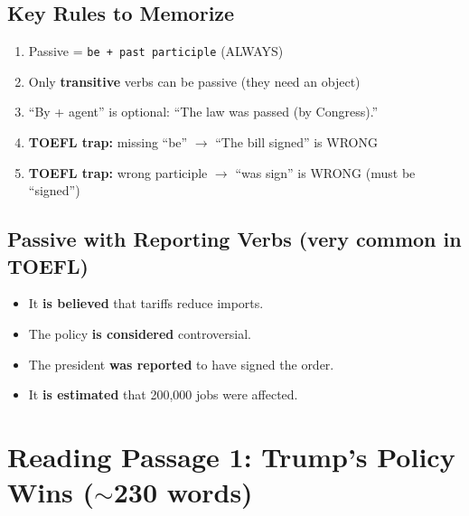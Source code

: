 \documentclass[10pt,a4paper]{article}
\begin{document}
\subsection*{Key Rules to Memorize}

\begin{enumerate}[nosep]
\item Passive = \texttt{be + past participle} (ALWAYS)
\item Only \textbf{transitive} verbs can be passive (they need an object)
\item ``By + agent'' is optional: ``The law was passed (by Congress).''
\item \textbf{TOEFL trap:} missing ``be'' $\to$ ``The bill signed'' is WRONG
\item \textbf{TOEFL trap:} wrong participle $\to$ ``was sign'' is WRONG (must be ``signed'')
\end{enumerate}

\subsection*{Passive with Reporting Verbs (very common in TOEFL)}

\begin{itemize}[nosep]
\item It \textbf{is believed} that tariffs reduce imports.
\item The policy \textbf{is considered} controversial.
\item The president \textbf{was reported} to have signed the order.
\item It \textbf{is estimated} that 200,000 jobs were affected.
\end{itemize}

\section*{Reading Passage 1: Trump's Policy Wins ($\sim$230 words)}
\end{document}

